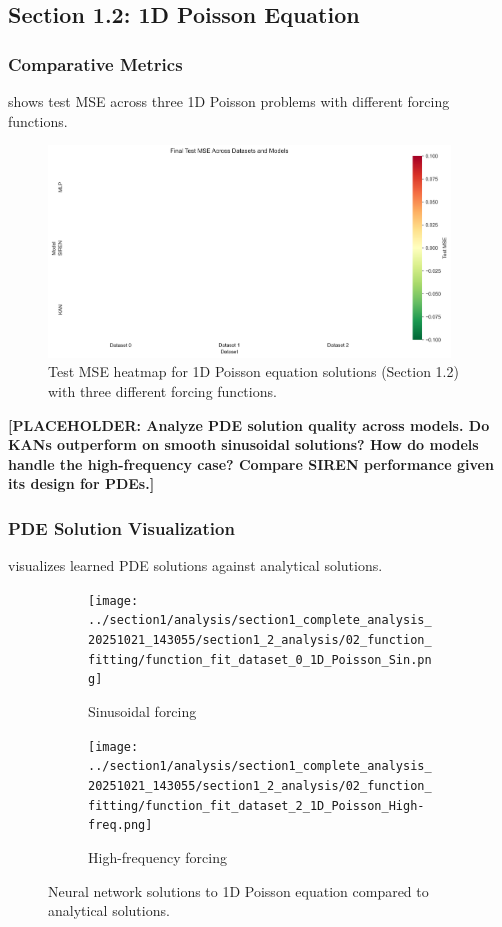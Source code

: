 \documentclass[11pt,a4paper]{article}
\begin{document}
\subsection{Section 1.2: 1D Poisson Equation}

\subsubsection{Comparative Metrics}

 shows test MSE across three 1D Poisson problems with different forcing functions.

\begin{figure}[htbp]
\centering
\includegraphics[width=0.95\textwidth]{../section1/analysis/section1_complete_analysis_20251021_143055/section1_2_analysis/01_comparative_metrics/all_datasets_heatmap_test.png}
\caption{Test MSE heatmap for 1D Poisson equation solutions (Section 1.2) with three different forcing functions.}
\label{fig:s12_heatmap}
\end{figure}

\textbf{[PLACEHOLDER: Analyze PDE solution quality across models. Do KANs outperform on smooth sinusoidal solutions? How do models handle the high-frequency case? Compare SIREN performance given its design for PDEs.]}

\subsubsection{PDE Solution Visualization}

 visualizes learned PDE solutions against analytical solutions.

\begin{figure}[htbp]
\centering
\begin{subfigure}{0.48\textwidth}
\texttt{[image: ../section1/analysis/section1\_complete\_analysis\_20251021\_143055/section1\_2\_analysis/02\_function\_fitting/function\_fit\_dataset\_0\_1D\_Poisson\_Sin.png]}
\caption{Sinusoidal forcing}
\end{subfigure}
\hfill
\begin{subfigure}{0.48\textwidth}
\texttt{[image: ../section1/analysis/section1\_complete\_analysis\_20251021\_143055/section1\_2\_analysis/02\_function\_fitting/function\_fit\_dataset\_2\_1D\_Poisson\_High-freq.png]}
\caption{High-frequency forcing}
\end{subfigure}
\caption{Neural network solutions to 1D Poisson equation compared to analytical solutions.}
\label{fig:s12_fits}
\end{figure}
\end{document}
